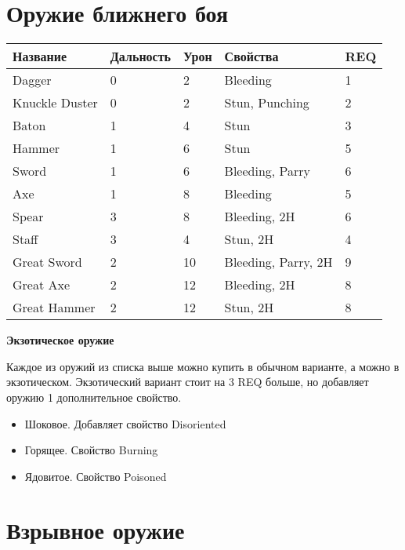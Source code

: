     \section*{Оружие ближнего боя}
\begin{table}[H]
\centering
\begin{tabular}{|l|l|l|l|l|}
\hline
Название       & Дальность & Урон & Свойства             & REQ \\ \hline
Dagger         & 0         & 2    & Bleeding             & 1   \\ \hline
Knuckle Duster & 0         & 2    & Stun, Punching       & 2   \\ \hline
Baton          & 1         & 4    & Stun                 & 3   \\ \hline
Hammer         & 1         & 6    & Stun                 & 5   \\ \hline
Sword          & 1         & 6    & Bleeding, Parry      & 6   \\ \hline
Axe            & 1         & 8    & Bleeding             & 5   \\ \hline
Spear          & 3         & 8    & Bleeding, 2H         & 6   \\ \hline
Staff          & 3         & 4    & Stun, 2H             & 4   \\ \hline
Great Sword    & 2         & 10   & Bleeding, Parry, 2H & 9   \\ \hline
Great Axe      & 2         & 12   & Bleeding, 2H         & 8   \\ \hline
Great Hammer    & 2         & 12   & Stun, 2H             & 8   \\ \hline
\end{tabular}
\end{table}

\textbf{Экзотическое оружие}

Каждое из оружий из списка выше можно купить в обычном варианте, а можно в экзотическом. Экзотический вариант стоит на 3 REQ больше, но
добавляет оружию 1 дополнительное свойство.

\begin{itemize}
    \item Шоковое. Добавляет свойство Disoriented
    \item Горящее. Свойство Burning
    \item Ядовитое. Свойство Poisoned
\end{itemize}

\section*{Взрывное оружие}

